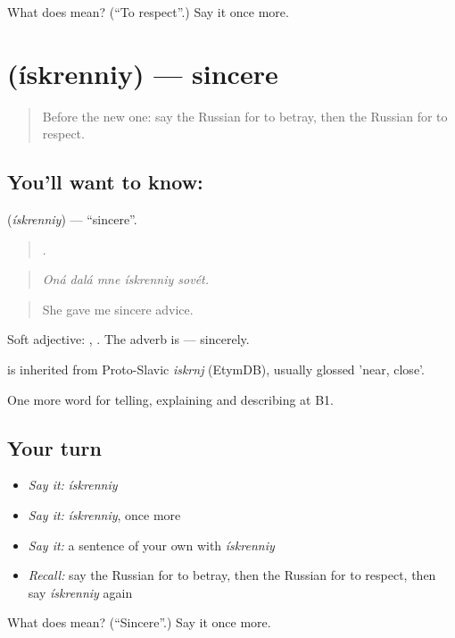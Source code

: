 \begin{tcolorbox}[breakable,colback=teal!4,colframe=teal!35!black,title={Before you move on}]
What does  mean? (\textquotedblleft{}To respect\textquotedblright{}.) Say it once more.
\end{tcolorbox}
\section[\texorpdfstring{\ru{искренний} (ískrenniy)}{искренний (ískrenniy)}]{ (ískrenniy) — sincere}

\label{lesson:RU-C479-iskrenniy}



\begin{quote}
Before the new one: say the Russian for to betray, then the Russian for to respect.
\end{quote}

\subsection*{You'll want to know: }
\textbf{} (\emph{ískrenniy}) — \textquotedblleft{}sincere\textquotedblright{}.

\begin{quote}
    .
\end{quote}

\begin{quote}
\emph{Oná dalá mne ískrenniy sovét.}
\end{quote}

\begin{quote}
She gave me sincere advice.
\end{quote}

Soft adjective: , . The adverb is \emph{} — sincerely.

\begin{cousinweb}
\emph{} is inherited from Proto-Slavic \emph{iskrnj} (EtymDB), usually glossed 'near, close'.
\end{cousinweb}

\begin{grammarlens}[title={What you've built}]
One more word for telling, explaining and describing at B1.
\end{grammarlens}

\subsection*{Your turn}
\begin{itemize}
\raggedright
  \item \emph{Say it:} \emph{ískrenniy}
  \item \emph{Say it:} \emph{ískrenniy}, once more
  \item \emph{Say it:} a sentence of your own with \emph{ískrenniy}
  \item \emph{Recall:} say the Russian for to betray, then the Russian for to respect, then say \emph{ískrenniy} again
\end{itemize}

\begin{tcolorbox}[breakable,colback=teal!4,colframe=teal!35!black,title={Before you move on}]
What does  mean? (\textquotedblleft{}Sincere\textquotedblright{}.) Say it once more.
\end{tcolorbox}
